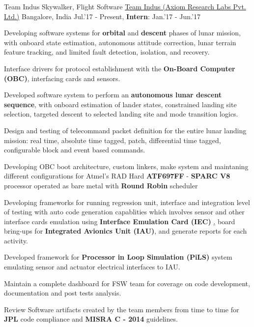\begin{cventries}
	\cventry
	{Team Indus Skywalker, Flight Software}
	{\href{http://www.teamindus.in/}{Team Indus (Axiom Research Labs Pvt. Ltd.)}}
	{Bangalore, India}
	{Jul.'17 - Present, \textbf{Intern}: Jan.'17 - Jun.'17}
	{
		\begin{cvitems}
			\item{Developing software systems for \textbf{orbital} and \textbf{descent} phases of lunar mission, with onboard state estimation, autonomous attitude correction, lunar terrain feature tracking, and limited fault detection, isolation, and recovery.}
			\item{Interface drivers for protocol establishment with the \textbf{On-Board Computer (OBC)}\href{http://ww1.microchip.com/downloads/en/DeviceDoc/ATF697FF.pdf}, interfacing cards and sensors.}
			\item{Developed software system to perform an \textbf{autonomous lunar descent sequence}, with onboard estimation of lander states, constrained landing site selection, targeted descent to selected landing site and mode transition logics.}
			\item{Design and testing of telecommand packet definition for the entire lunar landing mission: real time, absolute time tagged, patch, differential time tagged, configurable block and event based commands.}
			\item{Developing OBC boot architecture, custom linkers, make system and maintaning different configurations for Atmel's RAD Hard \textbf{ATF697FF} - \textbf{SPARC V8} processor operated as bare metal with \textbf{Round Robin} scheduler}
			\item{Developing frameworks for running regression unit, interface and integration level of testing with auto code generation capablities which involves sensor and other interface cards emulation using \textbf{Interface Emulation Card (IEC) }\href{http://zedboard.org/product/microzed/}, board bring-ups for \textbf{Integrated Avionics Unit (IAU)}, and generate reports for each activity.}
			\item{Developed framework for \textbf{Processor in Loop Simulation (PiLS)} system emulating sensor and actuator electrical interfaces to IAU.}
			\item{Maintain a complete dashboard for FSW team for coverage on code development, documentation and post tests analysis.}
\item{Review Software artifacts created by the team members from time to time for \textbf{JPL} code compliance and \textbf{MISRA C - 2014} guidelines.}
		\end{cvitems}
	}
\end{cventries}
